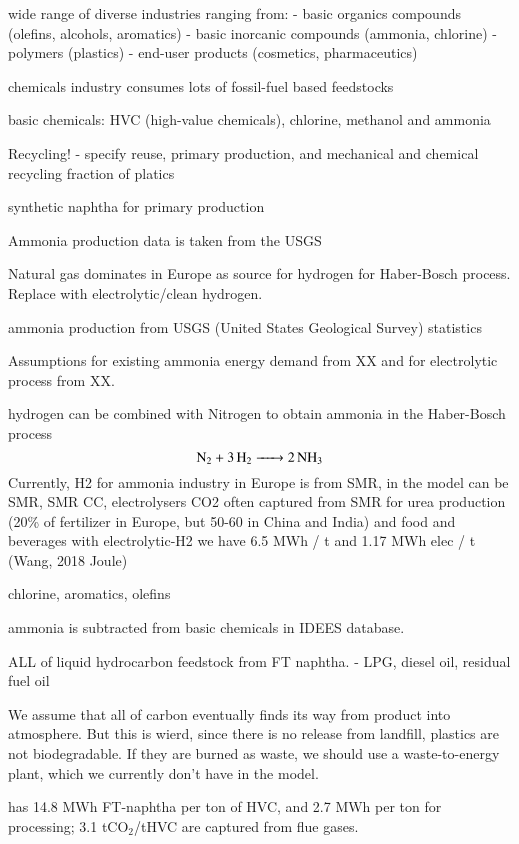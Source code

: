 wide range of diverse industries ranging from:
- basic organics compounds (olefins, alcohols, aromatics)
- basic inorcanic compounds (ammonia, chlorine)
- polymers (plastics)
- end-user products (cosmetics, pharmaceutics)

chemicals industry consumes lots of fossil-fuel based feedstocks 

basic chemicals: HVC (high-value chemicals), chlorine, methanol and ammonia

Recycling!
- specify reuse, primary production, and mechanical and chemical recycling
fraction of platics 

synthetic naphtha for primary production

Ammonia production data is taken from the USGS

Natural gas dominates in Europe as source for hydrogen for Haber-Bosch process.
Replace with electrolytic/clean hydrogen.


ammonia production from USGS (United States Geological Survey) statistics

Assumptions for existing ammonia energy demand from XX and for electrolytic
process from XX.

hydrogen can be combined with Nitrogen to obtain ammonia in the Haber-Bosch process 
\begin{equation}
    \ce{N2 + 3H2 -> 2NH3}
\end{equation}
Currently, H2 for ammonia industry in Europe is from SMR, in the model can be SMR, SMR CC, electrolysers
CO2 often captured from SMR for urea production (20\% of fertilizer in Europe,
but 50-60 in China and India) and food and beverages
with electrolytic-H2 we have 6.5 MWh  / t  and 1.17 MWh elec / t  (Wang, 2018 Joule)

chlorine, aromatics, olefins

ammonia is subtracted from basic chemicals in IDEES database.


ALL of liquid hydrocarbon feedstock from FT naphtha.
- LPG, diesel oil, residual fuel oil

We assume that all of carbon eventually finds its way from product into
atmosphere. But this is wierd, since there is no release from landfill, plastics
are not biodegradable. If they are burned as waste, we should use a
waste-to-energy plant, which we currently don't have in the model.

 has 14.8 MWh FT-naphtha per ton of HVC, and 2.7 MWh per
ton for processing; 3.1 tCO$_2$/tHVC are captured from flue gases.

